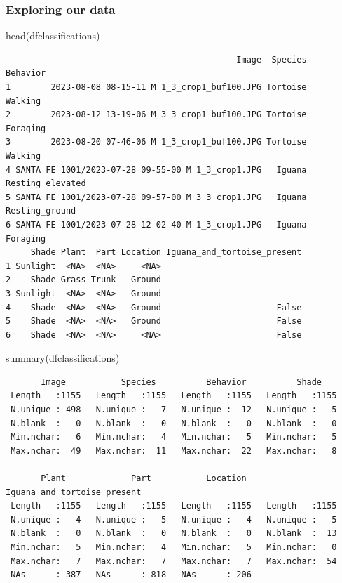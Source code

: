\documentclass[
  letterpaper,
  DIV=11,
  numbers=noendperiod]{scrartcl}
\newenvironment{Shaded}{\begin{snugshade}}{\end{snugshade}}
\newcommand{\FunctionTok}[1]{\textcolor[rgb]{0.28,0.35,0.67}{#1}}
\newcommand{\NormalTok}[1]{\textcolor[rgb]{0.00,0.23,0.31}{#1}}
\begin{document}
\subsubsection{Exploring our data}\label{exploring-our-data}

\begin{Shaded}
\begin{Highlighting}[]
\FunctionTok{head}\NormalTok{(dfclassifications)}
\end{Highlighting}
\end{Shaded}

\begin{verbatim}
                                              Image  Species         Behavior
1        2023-08-08 08-15-11 M 1_3_crop1_buf100.JPG Tortoise          Walking
2        2023-08-12 13-19-06 M 3_3_crop1_buf100.JPG Tortoise         Foraging
3        2023-08-20 07-46-06 M 1_3_crop1_buf100.JPG Tortoise          Walking
4 SANTA FE 1001/2023-07-28 09-55-00 M 1_3_crop1.JPG   Iguana Resting_elevated
5 SANTA FE 1001/2023-07-28 09-57-00 M 3_3_crop1.JPG   Iguana   Resting_ground
6 SANTA FE 1001/2023-07-28 12-02-40 M 1_3_crop1.JPG   Iguana         Foraging
     Shade Plant  Part Location Iguana_and_tortoise_present
1 Sunlight  <NA>  <NA>     <NA>                            
2    Shade Grass Trunk   Ground                            
3 Sunlight  <NA>  <NA>   Ground                            
4    Shade  <NA>  <NA>   Ground                       False
5    Shade  <NA>  <NA>   Ground                       False
6    Shade  <NA>  <NA>     <NA>                       False
\end{verbatim}

\begin{Shaded}
\begin{Highlighting}[]
\FunctionTok{summary}\NormalTok{(dfclassifications)}
\end{Highlighting}
\end{Shaded}

\begin{verbatim}
       Image           Species          Behavior          Shade     
 Length   :1155   Length   :1155   Length   :1155   Length   :1155  
 N.unique : 498   N.unique :   7   N.unique :  12   N.unique :   5  
 N.blank  :   0   N.blank  :   0   N.blank  :   0   N.blank  :   0  
 Min.nchar:   6   Min.nchar:   4   Min.nchar:   5   Min.nchar:   5  
 Max.nchar:  49   Max.nchar:  11   Max.nchar:  22   Max.nchar:   8  
                                                                    
       Plant             Part           Location    Iguana_and_tortoise_present
 Length   :1155   Length   :1155   Length   :1155   Length   :1155             
 N.unique :   4   N.unique :   5   N.unique :   4   N.unique :   5             
 N.blank  :   0   N.blank  :   0   N.blank  :   0   N.blank  :  13             
 Min.nchar:   5   Min.nchar:   4   Min.nchar:   5   Min.nchar:   0             
 Max.nchar:   7   Max.nchar:   7   Max.nchar:   7   Max.nchar:  54             
 NAs      : 387   NAs      : 818   NAs      : 206                              
\end{verbatim}
\end{document}
